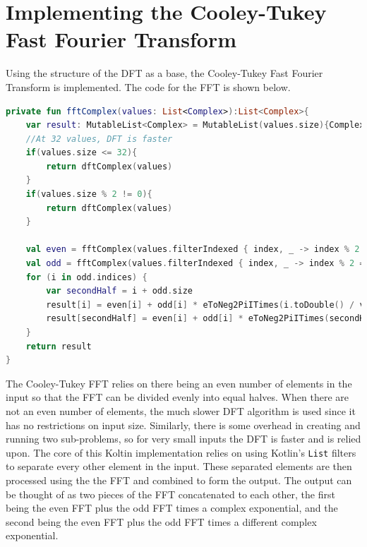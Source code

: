 \documentclass[sigconf]{acmart}
\begin{document}
\section{Implementing the Cooley-Tukey Fast Fourier Transform}
Using the structure of the DFT as a base, the Cooley-Tukey Fast Fourier Transform is implemented. The code for the FFT is shown below.
\begin{lstlisting}[language=kotlin]
private fun fftComplex(values: List<Complex>):List<Complex>{
    var result: MutableList<Complex> = MutableList(values.size){Complex(0.0,0.0)}
    //At 32 values, DFT is faster
    if(values.size <= 32){
        return dftComplex(values)
    }
    if(values.size % 2 != 0){
        return dftComplex(values)
    }
  
    val even = fftComplex(values.filterIndexed { index, _ -> index % 2 == 0 }, false)
    val odd = fftComplex(values.filterIndexed { index, _ -> index % 2 == 1 }, false)
    for (i in odd.indices) {
        var secondHalf = i + odd.size
        result[i] = even[i] + odd[i] * eToNeg2PiITimes(i.toDouble() / values.size)
        result[secondHalf] = even[i] + odd[i] * eToNeg2PiITimes(secondHalf.toDouble() / values.size)
    }
    return result
}
\end{lstlisting}
The Cooley-Tukey FFT relies on there being an even number of elements in the input so that the FFT can be divided evenly into equal halves. When there are not an even number of elements, the much slower DFT algorithm is used since it has no restrictions on input size. Similarly, there is some overhead in creating and running two sub-problems, so for very small inputs the DFT is faster and is relied upon. The core of this Koltin implementation relies on using Kotlin's \texttt{List} filters to separate every other element in the input. These separated elements are then processed using the the FFT and combined to form the output. The output can be thought of as two pieces of the FFT concatenated to each other, the first being the even FFT plus the odd FFT times a complex exponential, and the second being the even FFT plus the odd FFT times a different complex exponential. 
\end{document}
